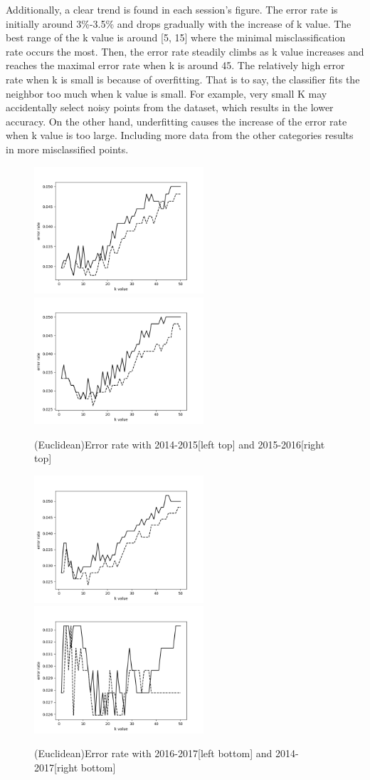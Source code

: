 \documentclass{article}
\begin{document}
Additionally, a clear trend is found in each session’s figure. The error rate is initially around 3\%-3.5\% and drops gradually with the increase of k value. The best range of the k value is around [5, 15] where the minimal misclassification rate occurs the most. Then, the error rate steadily climbs as k value increases and reaches the maximal error rate when k is around 45. The relatively high error rate when k is small is because of overfitting. That is to say, the classifier fits the neighbor too much when k value is small. For example, very small K may accidentally select noisy points from the dataset, which results in the lower accuracy. On the other hand, underfitting causes the increase of the error rate when k value is too large. Including more data from the other categories results in more misclassified points. 

\begin{figure}
  \centering
  \includegraphics[width=6.3cm]{knn_err14.png}
  \includegraphics[width=6.3cm]{knn_err15.png}
  \caption{(Euclidean)Error rate with 2014-2015[left top] and 2015-2016[right top]
  }
  \includegraphics[width=6.3cm]{knn_err16.png}
  \includegraphics[width=6.3cm]{knn_errall.png}
  \caption{(Euclidean)Error rate with 2016-2017[left bottom] and 2014-2017[right bottom]}
\end{figure}
\end{document}
